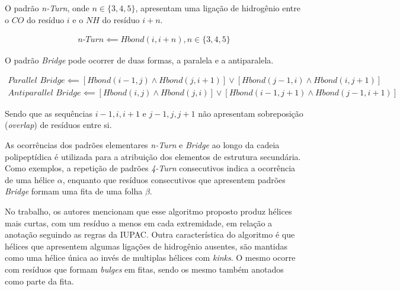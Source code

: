 O padrão \textit{n-Turn}, onde $n \in \{3, 4, 5\}$, apresentam uma ligação de hidrogênio entre o $CO$ do resíduo $i$ e o $NH$ do resíduo $i+n$. 

\begin{gather}
\textit{n-Turn} \impliedby Hbond(i,i+n), n \in \{3,4,5\}
\end{gather}

O padrão \textit{Bridge} pode ocorrer de duas formas, a paralela e a antiparalela.

\begin{gather}
\textit{Parallel Bridge} \impliedby [Hbond(i-1,j) \land Hbond(j,i+1)] \lor [Hbond(j-1,i) \land Hbond(i,j+1)] \\
\textit{Antiparallel Bridge} \impliedby [Hbond(i,j) \land Hbond(j,i)] \lor [Hbond(i-1,j+1) \land Hbond(j-1,i+1)]
\end{gather}

Sendo que as sequências $i-1,i,i+1$ e $j-1,j,j+1$ não apresentam sobreposição (\textit{overlap}) de resíduos entre si.

As ocorrências dos padrões elementares \textit{n-Turn} e \textit{Bridge} ao longo da cadeia polipeptídica é utilizada para a atribuição dos elementos de estrutura secundária. Como exemplos, a repetição de padrões \textit{4-Turn} consecutivos indica a ocorrência de uma hélice $\alpha$, enquanto que resíduos consecutivos que apresentem padrões \textit{Bridge} formam uma fita de uma folha $\beta$.

No trabalho, os autores mencionam que esse algoritmo proposto produz hélices mais curtas, com um resíduo a menos em cada extremidade, em relação a anotação seguindo as regras da IUPAC. Outra característica do algoritmo é que hélices que apresentem algumas ligações de hidrogênio ausentes, são mantidas como uma hélice única ao invés de multiplas hélices com \textit{kinks}. O mesmo ocorre com resíduos que formam \textit{bulges} em fitas, sendo os mesmo também anotados como parte da fita. 








